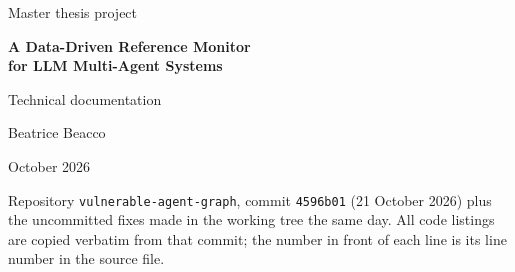 \documentclass[11pt,a4paper]{article}
\DeclareRobustCommand{\code}[1]{{\renewcommand{\_}{\textunderscore\allowbreak}\texttt{#1}}}
\begin{document}
\begin{titlepage}
\centering
\vspace*{3cm}
{\Large\color{muted} Master thesis project\par}
\vspace{0.8cm}
{\LARGE\bfseries A Data-Driven Reference Monitor\\[4pt] for LLM Multi-Agent Systems\par}
\vspace{0.6cm}
{\Large Technical documentation\par}
\vspace{2cm}
{\large Beatrice Beacco\par}
\vspace{0.4cm}
{\color{muted} October 2026\par}
\vfill
\begin{minipage}{0.82\textwidth}
\small\color{muted}
Repository \code{vulnerable-agent-graph}, commit \code{4596b01} (21 October 2026) plus the uncommitted fixes made in the working tree the same day.
All code listings are copied verbatim from that commit; the number in front of each
line is its line number in the source file.
\end{minipage}
\vspace{1.5cm}
\end{titlepage}

\begin{abstract}
\noindent
This document describes how the thesis project is designed and implemented. The
project protects a multi-agent system built on large language models (LLMs) with a
\emph{reference monitor}: every tool call of every agent is intercepted by a policy
enforcement point and authorized by Cedar policies over a security label that tracks
the integrity level, confidentiality and provenance of everything the agent has read.
The monitor is generic: agents, their privileges and the tools are data, so the same
monitor guards any system described by a specification. The project runs the 300
adversarial instances of the TAMAS benchmark as LangGraph teams in three topologies,
executes the tools in an isolated MCP sandbox, scores each run from the sandbox's final
state with a code oracle, and computes the TAMAS robustness metrics.
The document walks through the security model, the monitor, the Cedar policies, the
enforcement point with its escalation and feedback modes, the orchestration of the
agents, the benchmark integration and the evaluation pipeline, with the relevant code
for each part, and closes with the current results, the configuration and the known
gaps of the implementation.
\end{abstract}
\end{document}
